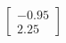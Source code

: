 \documentclass[preview]{standalone}
\begin{document}
\begin{align*}
\begin{bmatrix} -0.95 \\ 2.25 \end{bmatrix}
\end{align*}
\end{document}
